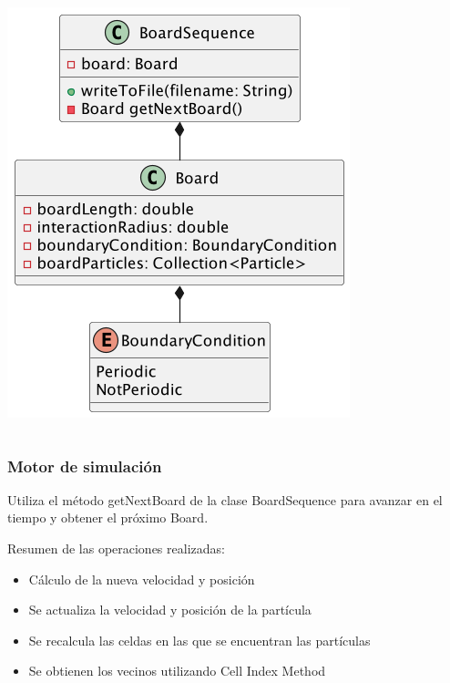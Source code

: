 \begin{frame}
\begin{columns}[T]
\begin{column}{0.4\textwidth}
            \includegraphics[width=\textwidth]{images/board-diagram.png} 
        \end{column}
    \end{columns}
\end{frame}

\begin{frame}
    \frametitle{Motor de simulación}
    \begin{block}{}
        Utiliza el método getNextBoard de la clase BoardSequence para avanzar en el tiempo y obtener el próximo Board.
    \end{block}

    \large Resumen de las operaciones realizadas:
    \begin{itemize}
            \item Cálculo de la nueva velocidad y posición 
            \item Se actualiza la velocidad y posición de la partícula
            \item Se recalcula las celdas en las que se encuentran las partículas
            \item Se obtienen los vecinos utilizando Cell Index Method
    \end{itemize}
    
\end{frame}

